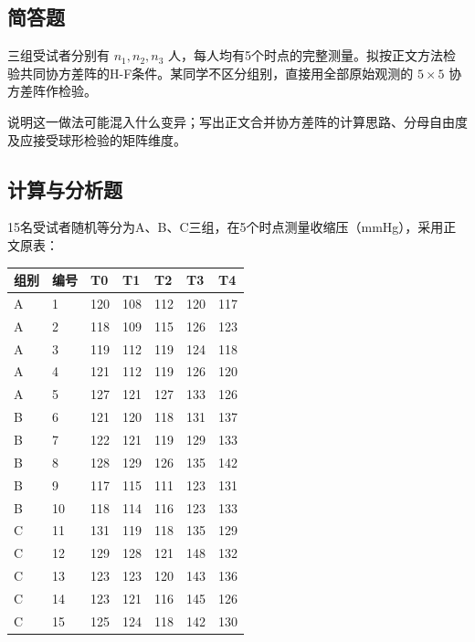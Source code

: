 \subsection{简答题}

\par\addvspace{6pt}\noindent\begin{minipage}{\linewidth}


三组受试者分别有 \(n_1,n_2,n_3\) 人，每人均有5个时点的完整测量。拟按正文方法检验共同协方差阵的H-F条件。某同学不区分组别，直接用全部原始观测的 \(5\times5\) 协方差阵作检验。

说明这一做法可能混入什么变异；写出正文合并协方差阵的计算思路、分母自由度及应接受球形检验的矩阵维度。



\end{minipage}\par\vspace{4pt}

\clearpage

\subsection{计算与分析题}


15名受试者随机等分为A、B、C三组，在5个时点测量收缩压（mmHg），采用正文原表：

\begin{center}\small\setlength{\tabcolsep}{5pt}\renewcommand{\arraystretch}{1.18}\begin{tabular}{@{}lllllll@{}}
\toprule
组别 & 编号 & T0 & T1 & T2 & T3 & T4 \\
\midrule

A & 1 & 120 & 108 & 112 & 120 & 117 \\
A & 2 & 118 & 109 & 115 & 126 & 123 \\
A & 3 & 119 & 112 & 119 & 124 & 118 \\
A & 4 & 121 & 112 & 119 & 126 & 120 \\
A & 5 & 127 & 121 & 127 & 133 & 126 \\
B & 6 & 121 & 120 & 118 & 131 & 137 \\
B & 7 & 122 & 121 & 119 & 129 & 133 \\
B & 8 & 128 & 129 & 126 & 135 & 142 \\
B & 9 & 117 & 115 & 111 & 123 & 131 \\
B & 10 & 118 & 114 & 116 & 123 & 133 \\
C & 11 & 131 & 119 & 118 & 135 & 129 \\
C & 12 & 129 & 128 & 121 & 148 & 132 \\
C & 13 & 123 & 123 & 120 & 143 & 136 \\
C & 14 & 123 & 121 & 116 & 145 & 126 \\
C & 15 & 125 & 124 & 118 & 142 & 130 \\
\bottomrule\end{tabular}\end{center}

